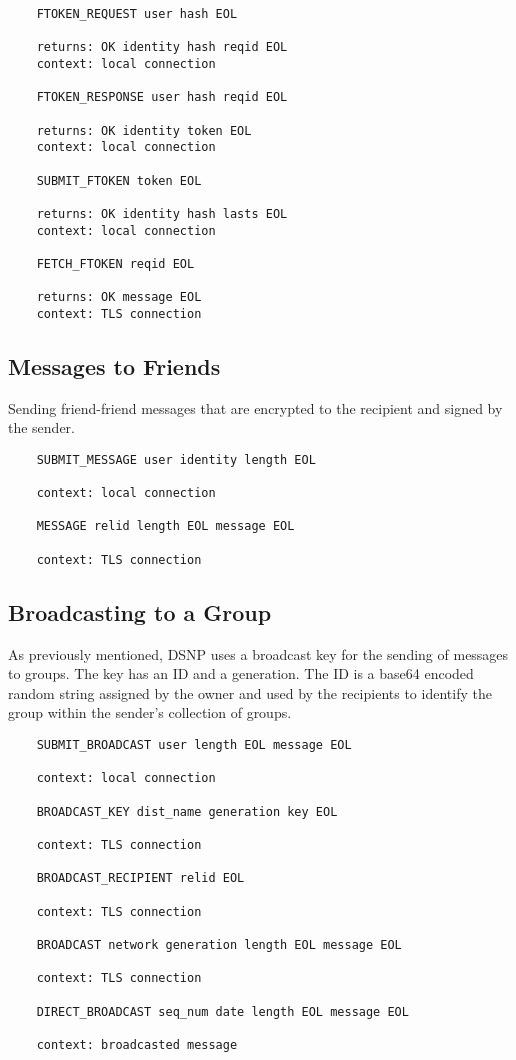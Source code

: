 \documentclass[letterpaper,11pt,oneside]{article}
\begin{document}
\vspace{10pt}
\begin{verbatim}
    FTOKEN_REQUEST user hash EOL 

    returns: OK identity hash reqid EOL
    context: local connection

    FTOKEN_RESPONSE user hash reqid EOL 

    returns: OK identity token EOL
    context: local connection

    SUBMIT_FTOKEN token EOL 

    returns: OK identity hash lasts EOL
    context: local connection

    FETCH_FTOKEN reqid EOL

    returns: OK message EOL
    context: TLS connection
\end{verbatim}

\subsection{Messages to Friends}

Sending friend-friend messages that are encrypted to the recipient and signed
by the sender. 

\vspace{10pt}
\begin{verbatim}
    SUBMIT_MESSAGE user identity length EOL

    context: local connection

    MESSAGE relid length EOL message EOL

    context: TLS connection
\end{verbatim}

\subsection{Broadcasting to a Group}

As previously mentioned, DSNP uses a broadcast key for the sending of messages
to groups. The key has an ID and a generation. The ID is a base64 encoded
random string assigned by the owner and used by the recipients to identify the
group within the sender's collection of groups.

\vspace{10pt}
\begin{verbatim}
    SUBMIT_BROADCAST user length EOL message EOL

    context: local connection

    BROADCAST_KEY dist_name generation key EOL

    context: TLS connection

    BROADCAST_RECIPIENT relid EOL

    context: TLS connection

    BROADCAST network generation length EOL message EOL

    context: TLS connection

    DIRECT_BROADCAST seq_num date length EOL message EOL

    context: broadcasted message
\end{verbatim}
\end{document}

